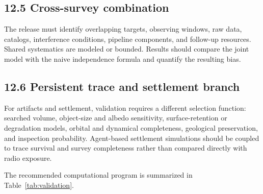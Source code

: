 \documentclass[11pt,a4paper]{article}
\begin{document}
\subsection{12.5 Cross-survey combination}\label{125-cross-survey-combination}

The release must identify overlapping targets, observing windows, raw data, catalogs, interference conditions, pipeline components, and follow-up resources. Shared systematics are modeled or bounded. Results should compare the joint model with the naive independence formula and quantify the resulting bias.

\subsection{12.6 Persistent trace and settlement branch}\label{126-persistent-trace-and-settlement-branch}

For artifacts and settlement, validation requires a different selection function: searched volume, object-size and albedo sensitivity, surface-retention or degradation models, orbital and dynamical completeness, geological preservation, and inspection probability. Agent-based settlement simulations should be coupled to trace survival and survey completeness rather than compared directly with radio exposure.

The recommended computational program is summarized in Table~\ref{tab:validation}.
\end{document}
